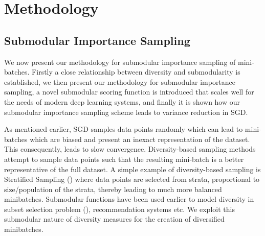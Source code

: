 \documentclass[a4paper,twoside]{iiththesis}
\theoremstyle{definition}
\theoremstyle{definition}
\newcommand{\myalgo}{Submodular-SGD\xspace}
\theoremstyle{remark}
\begin{document}
\part{Methodology}
\chapter{ Submodular Importance Sampling}
We now present our methodology for submodular importance sampling of mini-batches. Firstly a close relationship between diversity and submodularity is established, we then present our methodology for submodular importance sampling, a novel submodular scoring function is introduced that scales well for the needs of modern deep learning systems, and finally it is shown how our submodular importance sampling scheme leads to variance reduction in SGD.

As mentioned earlier, SGD samples data points randomly which can lead to mini-batches which are biased and present an inexact representation of the dataset. This consequently, leads to slow convergence. Diversity-based sampling methods attempt to sample data points such that the resulting mini-batch is a better representative of the full dataset. A simple example of diversity-based sampling is Stratified Sampling (\cite{zhao2014accelerating}) where data points are selected from strata, proportional to size/population of the strata, thereby leading to much more balanced minibatches. Submodular functions have been used earlier to model diversity in subset selection problem (\cite{tschiatschek2016learning}), recommendation systems \cite{ashkan2015optimal} etc. We exploit this submodular nature of diversity measures for the creation of diversified minibatches. 


\end{document}
